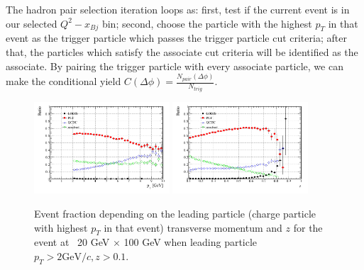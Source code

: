 The hadron pair selection iteration loops as: first, test if the current event is in
our selected $Q^{2}-x_{Bj}$ bin; second, choose the particle with the highest
$p_{T}$ in that event as the trigger particle which passes the trigger particle cut criteria;
after that, the particles which satisfy the associate cut criteria will be identified
as the associate. By pairing the trigger particle with every associate particle, we can
make the conditional yield $C(\Delta\phi)=\frac{N_{pair}(\Delta\phi)}{N_{trig}}$.


\begin{figure} 
\begin{center} 
\includegraphics[width=0.45\textwidth]
{plots/chpt6/ep_20x100_y_0.7_Q2_4_trigPt_ratio.png}
\includegraphics[width=0.45\textwidth]
{plots/chpt6/ep_20x100_y_0.7_Q2_4_trigZ_ratio.png}
\end{center} 
\caption[Process fraction depending on trigger particle kinematics]
{Event fraction depending on the leading particle (charge particle with highest $p_{T}$ in that event) transverse momentum and $z$
for the event at \ep\ 20 GeV $\times$ 100 GeV when leading particle $p_{T}>2\mathrm{GeV}/c, z>0.1$.}
\label{fig:trig_kinematic}
\end{figure}


